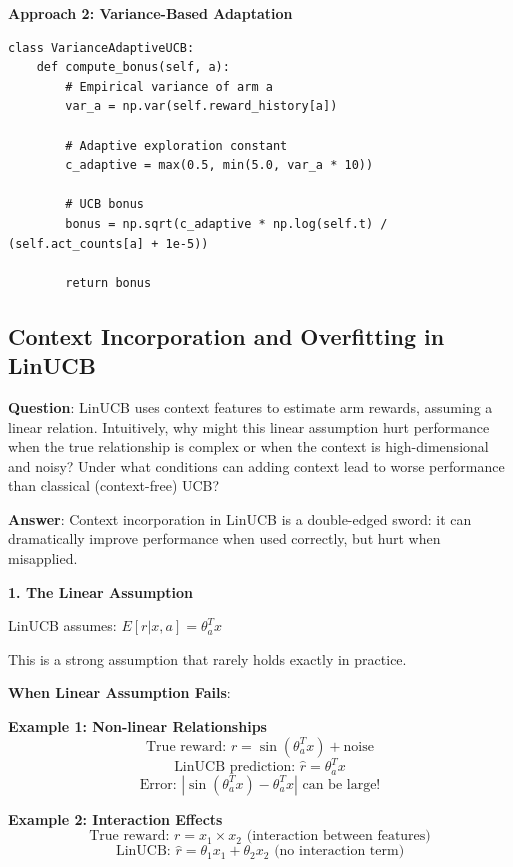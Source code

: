 \documentclass[12pt]{article}
\begin{document}
{{{\textbf{Approach 2: Variance-Based Adaptation}

\begin{verbatim}
class VarianceAdaptiveUCB:
    def compute_bonus(self, a):
        # Empirical variance of arm a
        var_a = np.var(self.reward_history[a])

        # Adaptive exploration constant
        c_adaptive = max(0.5, min(5.0, var_a * 10))

        # UCB bonus
        bonus = np.sqrt(c_adaptive * np.log(self.t) / (self.act_counts[a] + 1e-5))

        return bonus
\end{verbatim}

\subsection{Context Incorporation and Overfitting in LinUCB}

\textbf{Question}: LinUCB uses context features to estimate arm rewards, assuming a linear relation. Intuitively, why might this linear assumption hurt performance when the true relationship is complex or when the context is high-dimensional and noisy? Under what conditions can adding context lead to worse performance than classical (context-free) UCB?

\textbf{Answer}: Context incorporation in LinUCB is a double-edged sword: it can dramatically improve performance when used correctly, but hurt when misapplied.

\textbf{1. The Linear Assumption}

LinUCB assumes: $E[r | x, a] = \theta_a^T x$

This is a strong assumption that rarely holds exactly in practice.

\textbf{When Linear Assumption Fails}:

\textbf{Example 1: Non-linear Relationships}
\begin{equation}
\text{True reward: } r = \sin(\theta_a^T x) + \text{noise}
\end{equation}
\begin{equation}
\text{LinUCB prediction: } \hat{r} = \theta_a^T x
\end{equation}
\begin{equation}
\text{Error: } |\sin(\theta_a^T x) - \theta_a^T x| \text{ can be large!}
\end{equation}

\textbf{Example 2: Interaction Effects}
\begin{equation}
\text{True reward: } r = x_1 \times x_2 \text{ (interaction between features)}
\end{equation}
\begin{equation}
\text{LinUCB: } \hat{r} = \theta_1 x_1 + \theta_2 x_2 \text{ (no interaction term)}
\end{equation}

}}}
\end{document}
